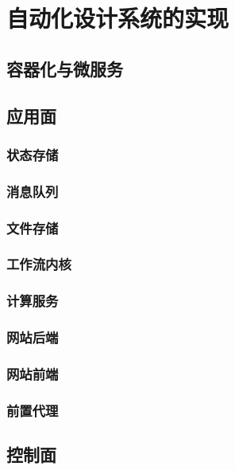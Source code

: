 \documentclass[index]{subfiles}
\begin{document}
\chapter{自动化设计系统的实现}\label{sec:impl}
\section{容器化与微服务}
\section{应用面}
\subsection{状态存储}
\subsection{消息队列}
\subsection{文件存储}
\subsection{工作流内核}
\subsection{计算服务}
\subsection{网站后端}
\subsection{网站前端}
\subsection{前置代理}
\section{控制面}
\end{document}
